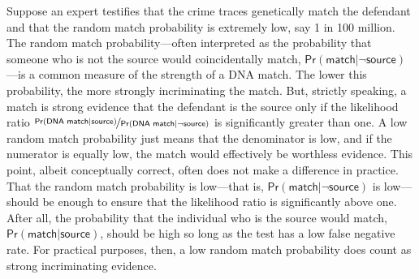 \documentclass{article}
\newcommand{\pr}{\mathsf{Pr}}
\begin{document}
   
   Suppose an expert testifies that the crime traces genetically
match the defendant and  that the random match probability is extremely low, say 1 in 100 million. %
The random match probability---often interpreted as the probability that someone who is not the source would coincidentally match, $\pr(\textsf{match} \vert \neg \textsf{source})$---is a common measure of the strength of a DNA match. The lower this probability, the more strongly incriminating the match. %
But, strictly speaking, a match  is strong evidence that the defendant is the source only if 
the likelihood ratio $\nicefrac{\pr(\textsf{DNA match} \vert \textsf{source})}{\pr(\textsf{DNA match} \vert \neg \textsf{source})}$ is significantly greater than one. A low random match probability just means that the denominator is low, and if the numerator is equally low, the match would effectively be worthless evidence.  %
   This point, albeit conceptually correct, often does not make a difference in  practice.  
   That the random match probability is low---that is,  $\pr(\textsf{match} \vert \neg \textsf{source})$ is low---should be enough to ensure that the likelihood ratio is significantly above one. After all, the probability that the individual who is the source would match, $\pr(\textsf{match} \vert \textsf{source})$, should be high so long as the test has a  low false negative rate.  For practical purposes, then, a  low random match probability does count as strong incriminating evidence. 
\end{document}
